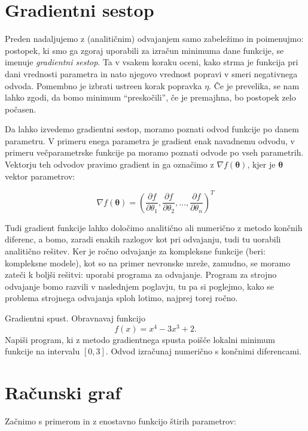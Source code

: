 \section{Gradientni sestop}

Preden nadaljujemo z (analitičnim) odvajanjem samo zabeležimo in poimenujmo: postopek, ki smo ga zgoraj uporabili za izračun minimuma dane funkcije, se imenuje {\em gradientni sestop}. Ta v vsakem koraku oceni, kako strma je funkcija pri dani vrednosti parametra in nato njegovo vrednost popravi v smeri negativnega odvoda. Pomembno je izbrati ustreen korak popravka $\eta$. Če je prevelika, se nam lahko zgodi, da bomo minimum ``preskočili'', če je premajhna, bo postopek zelo počasen.

Da lahko izvedemo gradientni sestop, moramo poznati odvod funkcije po danem parametru. 
V primeru enega parametra je gradient enak navadnemu odvodu, 
v primeru večparametrske funkcije pa moramo poznati odvode po vseh parametrih. 
Vektorju teh odvodov pravimo gradient in ga označimo z $\nabla f(\boldsymbol{\theta})$, 
kjer je $\boldsymbol{\theta}$ vektor parametrov:

\[
\nabla f(\boldsymbol{\theta}) = 
\left(
\frac{\partial f}{\partial \theta_1},
\frac{\partial f}{\partial \theta_2},
\dots,
\frac{\partial f}{\partial \theta_n}
\right)^T
\]

Tudi gradient funkcije lahko določimo analitično ali numerično z metodo končnih diferenc, a bomo, zaradi enakih razlogov kot pri odvajanju, tudi tu uorabili analitično rešitev. Ker je ročno odvajanje za kompleksne funkcije (beri: kompleksne modele), kot so na primer nevronske mreže, zamudno, se moramo zateči k boljši rešitvi: uporabi programa za odvajanje. Program za strojno odvajanje bomo razvili v naslednjem poglavju, tu pa si poglejmo, kako se problema strojnega odvajanja sploh lotimo, najprej torej ročno.

\begin{exercise}{Gradientni spust.}
Obravnavaj funkcijo
\[
f(x)=x^4-3x^3+2.
\]
Napiši program, ki z metodo gradientnega spusta poišče lokalni minimum funkcije na intervalu $[0,3]$. Odvod izračunaj numerično s končnimi diferencami.
\end{exercise}


\section{Računski graf}

Začnimo s primerom in z enostavno funkcijo štirih parametrov:

